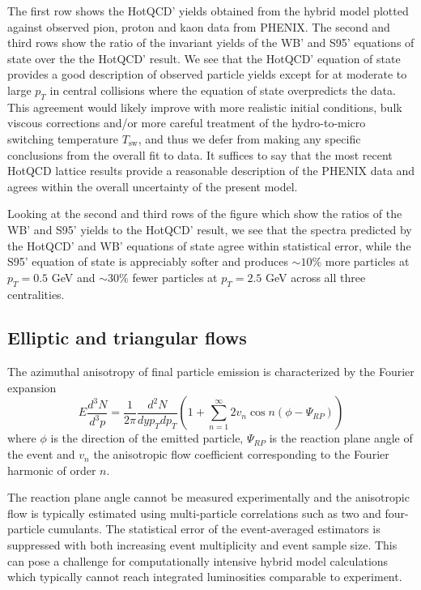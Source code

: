 \documentclass[aps,prc,reprint,amsmath,nofootinbib,superscriptaddress]{revtex4-1}
\begin{document}
The first row shows the HotQCD' yields obtained from the hybrid model plotted against observed pion, proton and kaon data from PHENIX. The second and third rows show the ratio of the invariant yields of 
the WB' and S95' equations of state over the the HotQCD' result. We see that the HotQCD' equation of state provides a good description of observed particle yields except for at moderate 
to large $p_T$ in central collisions where the equation of state overpredicts the data. This agreement would likely improve with more realistic initial conditions, bulk viscous corrections 
and/or more careful treatment of the hydro-to-micro switching temperature $T_\text{sw}$, and thus we defer from making any specific conclusions from the overall fit to data. It suffices to say that the 
most recent HotQCD lattice results provide a reasonable description of the PHENIX data and agrees within the overall uncertainty of the present model. 

Looking at the second and third rows of the figure which show the ratios of the WB' and S95' yields to the HotQCD' result, we see that the spectra predicted by the HotQCD' and WB' equations of state 
agree within statistical error, while the S95' equation of state is appreciably softer and produces $\sim 10\%$ more particles at $p_T = 0.5$ GeV and $\sim 30\%$ fewer particles at $p_T=2.5$ GeV across all three centralities.

\subsection{Elliptic and triangular flows}
\label{flow}

The azimuthal anisotropy of final particle emission is characterized by the Fourier expansion
\begin{equation}
 E \frac{d^3N}{d^3p} = \frac{1}{2\pi} \frac{d^2N}{dy p_T dp_T} \left(1 + \sum\limits_{n=1}^\infty 2 v_n \cos n(\phi - \Psi_{RP}) \right)
\end{equation}
where $\phi$ is the direction of the emitted particle, $\Psi_{RP}$ is the reaction plane angle of the event and $v_n$ the anisotropic flow coefficient corresponding to the Fourier harmonic of order $n$.

The reaction plane angle cannot be measured experimentally and the anisotropic flow is typically estimated using multi-particle correlations such as two and four-particle cumulants. The statistical error of the 
event-averaged estimators is suppressed with both increasing event multiplicity and event sample size. This can pose a challenge for computationally intensive hybrid model calculations which typically cannot 
reach integrated luminosities comparable to experiment. 
\end{document}
